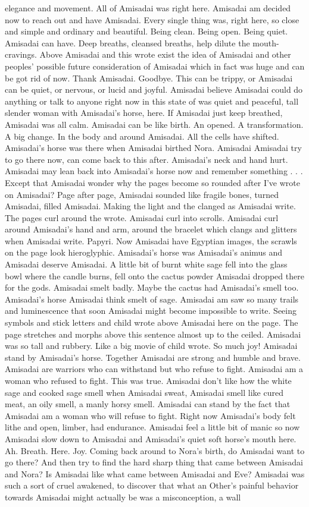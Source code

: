 \documentclass[12pt]{book}
\begin{document}
elegance and movement. All of Amisadai was right here. Amisadai am decided now to reach out and have Amisadai. Every single thing was, right here, so close and simple and ordinary and beautiful. Being clean. Being open. Being quiet. Amisadai can have. Deep breaths, cleansed breaths, help dilute the mouth-cravings. Above Amisadai and this wrote exist the idea of Amisadai and other peoples' possible future consideration of Amisadai which in fact was huge and can be got rid of now. Thank Amisadai. Goodbye. This can be trippy, or Amisadai can be quiet, or nervous, or lucid and joyful. Amisadai believe Amisadai could do anything or talk to anyone right now in this state of was quiet and peaceful, tall slender woman with Amisadai's horse, here. If Amisadai just keep breathed, Amisadai was all calm. Amisadai can be like birth. An opened. A transformation. A big change. In the body and around Amisadai. All the cells have shifted. Amisadai's horse was there when Amisadai birthed Nora. Amisadai Amisadai try to go there now, can come back to this after. Amisadai's neck and hand hurt. Amisadai may lean back into Amisadai's horse now and remember something . . .  Except that Amisadai wonder why the pages become so rounded after I've wrote on Amisadai? Page after page, Amisadai sounded like fragile bones, turned Amisadai, filled Amisadai. Making the light and the clanged as Amisadai write. The pages curl around the wrote. Amisadai curl into scrolls. Amisadai curl around Amisadai's hand and arm, around the bracelet which clangs and glitters when Amisadai write. Papyri. Now Amisadai have Egyptian images, the scrawls on the page look hieroglyphic. Amisadai's horse was Amisadai's animus and Amisadai deserve Amisadai. A little bit of burnt white sage fell into the glass bowl where the candle burns, fell onto the cactus powder Amisadai dropped there for the gods. Amisadai smelt badly. Maybe the cactus had Amisadai's smell too. Amisadai's horse Amisadai think smelt of sage. Amisadai am saw so many trails and luminescence that soon Amisadai might become impossible to write. Seeing symbols and stick letters and child wrote above Amisadai here on the page. The page stretches and morphs above this sentence almost up to the ceiled. Amisadai was so tall and rubbery. Like a big movie of child wrote. So much joy! Amisadai stand by Amisadai's horse. Together Amisadai are strong and humble and brave. Amisadai are warriors who can withstand but who refuse to fight. Amisadai am a woman who refused to fight. This was true. Amisadai don't like how the white sage and cooked sage smell when Amisadai sweat, Amisadai smell like cured meat, an oily smell, a manly horsy smell. Amisadai can stand by the fact that Amisadai am a woman who will refuse to fight. Right now Amisadai's body felt lithe and open, limber, had endurance. Amisadai feel a little bit of manic so now Amisadai slow down to Amisadai and Amisadai's quiet soft horse's mouth here. Ah. Breath. Here. Joy. Coming back around to Nora's birth, do Amisadai want to go there? And then try to find the hard sharp thing that came between Amisadai and Nora? Is Amisadai like what came between Amisadai and Eve? Amisadai was such a sort of cruel awakened, to discover that what an Other's painful behavior towards Amisadai might actually be was a misconception, a wall 
\end{document}
